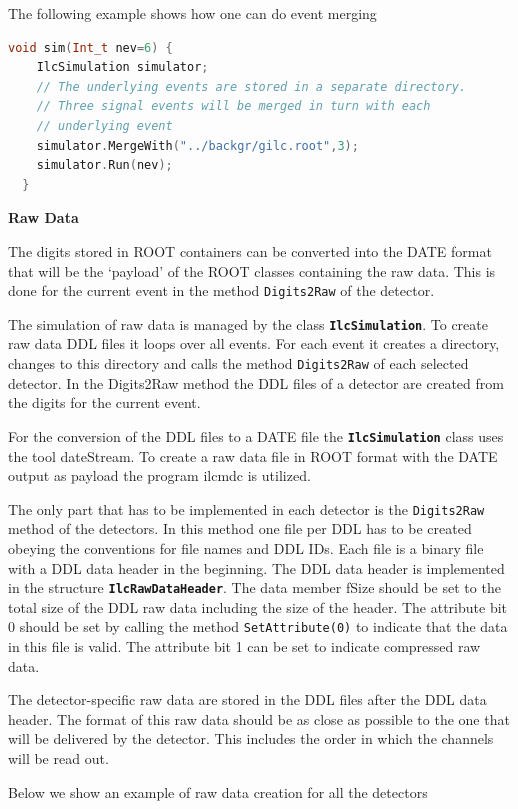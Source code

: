 \documentclass[12pt,a4paper,twoside]{article}
\newcommand{\class}[1]{\texttt{\textbf{#1}}\xspace}
\newcommand{\method}[1]{\texttt{#1}\xspace}
\begin{document}
The following example shows how one can do event merging

\begin{lstlisting}[language=C++, title={Event merging}]
  void sim(Int_t nev=6) {
    IlcSimulation simulator;
    // The underlying events are stored in a separate directory.
    // Three signal events will be merged in turn with each
    // underlying event
    simulator.MergeWith("../backgr/gilc.root",3);
    simulator.Run(nev);
  }
\end{lstlisting}

\noindent
\textbf{Raw Data}

The digits stored in ROOT containers can be converted into the DATE\cite{DATE}
format that will be the `payload' of the ROOT classes containing the
raw data. This is done for the current event in the method
\method{Digits2Raw} of the detector.

The simulation of raw data is managed by the class \class{IlcSimulation}. To
create raw data DDL files it loops over all events. For each event it
creates a directory, changes to this directory and calls the method
\method{Digits2Raw} of each selected detector. In the Digits2Raw method the DDL
files of a detector are created from the digits for the current
event. 

For the conversion of the DDL files to a DATE file the
\class{IlcSimulation} class uses the tool dateStream. To create a raw
data file in ROOT format with the DATE output as payload the program ilcmdc is
utilized.

The only part that has to be implemented in each detector is
the \method{Digits2Raw} method of the detectors. In this method one file per
DDL has to be created obeying the conventions for file names and DDL
IDs. Each file is a binary file with a DDL data header in the
beginning. The DDL data header is implemented in the structure
\class{IlcRawDataHeader}. The data member fSize should be set to the total
size of the DDL raw data including the size of the header. The
attribute bit 0 should be set by calling the method \method{SetAttribute(0)} to
indicate that the data in this file is valid. The attribute bit 1 can
be set to indicate compressed raw data.

The detector-specific raw data are stored in the DDL files after the
DDL data header. The format of this raw data should be as close as
possible to the one that will be delivered by the detector. This
includes the order in which the channels will be read out.

Below we show an example of raw data creation for all the detectors
\end{document}
